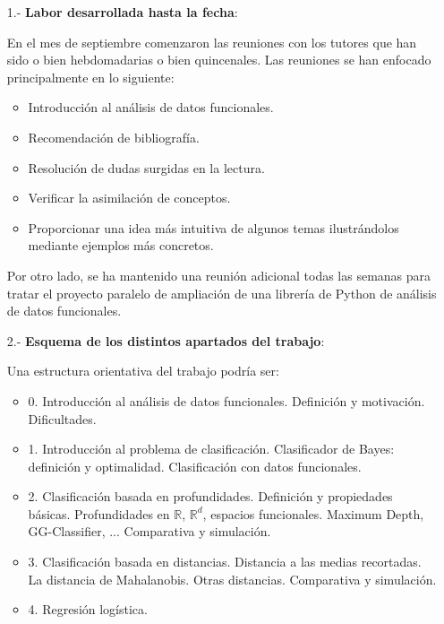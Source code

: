 \documentclass[a4paper,oneside,11pt,leqno]{article}
\begin{document}
\begin{enumerate}

    \item[1.-] {\bf Labor desarrollada hasta la fecha}:

          En el mes de septiembre comenzaron las reuniones con los tutores que han sido o bien hebdomadarias o bien quincenales.
          Las reuniones se han enfocado principalmente en lo siguiente:
          \begin{itemize}
              \item Introducción al análisis de datos funcionales.
              \item Recomendación de bibliografía.
              \item Resolución de dudas surgidas en la lectura.
              \item Verificar la asimilación de conceptos.
              \item Proporcionar una idea más intuitiva de algunos temas ilustrándolos mediante ejemplos más concretos.
          \end{itemize}

          Por otro lado, se ha mantenido una reunión adicional todas las semanas para tratar el proyecto paralelo de ampliación
          de una librería de Python \cite{scikit-fda} de análisis de datos funcionales.

    \item[2.-] {\bf Esquema de los distintos apartados del trabajo}:

          Una estructura orientativa del trabajo podría ser:

          \begin{itemize}
              \item 0. Introducción al análisis de datos funcionales.
                     Definición y motivación.
                     Dificultades.
              \item 1. Introducción al problema de clasificación.
                     Clasificador de Bayes: definición y optimalidad.
                     Clasificación con datos funcionales.
              \item 2. Clasificación basada en profundidades.
                     Definición y propiedades básicas.
                     Profundidades en $\mathbb{R}$, $\mathbb{R}^d$, espacios funcionales.
                     Maximum Depth, GG-Classifier, ...
                     Comparativa y simulación.
              \item 3. Clasificación basada en distancias.
                     Distancia a las medias recortadas.
                     La distancia de Mahalanobis.
                     Otras distancias.
                     Comparativa y simulación.
              \item 4. Regresión logística.
          \end{itemize}


\end{enumerate}
\end{document}
